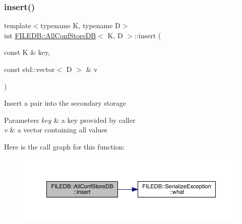 \subsubsection{\texorpdfstring{insert()}{insert()}\hspace{0.1cm}{\footnotesize\ttfamily [2/2]}}
{\footnotesize\ttfamily template$<$typename K, typename D$>$ \\
int \mbox{\hyperlink{classFILEDB_1_1AllConfStoreDB}{F\+I\+L\+E\+D\+B\+::\+All\+Conf\+Store\+DB}}$<$ K, D $>$\+::insert (\begin{DoxyParamCaption}\item[{const K \&}]{key,  }\item[{const std\+::vector$<$ D $>$ \&}]{v }\end{DoxyParamCaption})\hspace{0.3cm}{\ttfamily [inline]}}

Insert a pair into the secondary storage 
\begin{DoxyParams}{Parameters}
{\em key} & a key provided by caller \\
\hline
{\em v} & a vector containing all values \\
\hline
\end{DoxyParams}
Here is the call graph for this function\+:
\nopagebreak
\begin{figure}[H]
\begin{center}
\leavevmode
\includegraphics[width=350pt]{df/db6/classFILEDB_1_1AllConfStoreDB_abf4a1ccd7306de436ba1ec61b242e02f_cgraph}
\end{center}
\end{figure}
\mbox{\label{classFILEDB_1_1AllConfStoreDB_ac2c898624d4b32c526951edfb6271d60}} 
